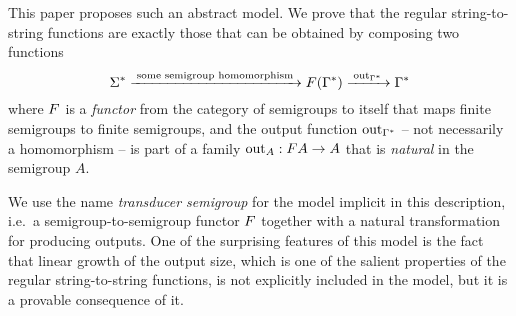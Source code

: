 This paper proposes such an abstract model.  We prove that the regular  string-to-string functions are exactly those that can be obtained by composing two functions
\[ \Sigma^* 
  \xrightarrow{\;\text{some semigroup homomorphism}\;}
    \functor(\Gamma^*)
    \xrightarrow{\;\outfun_{\Gamma^*}\;}
    \Gamma^*
\]
where $\functor$ is a \emph{functor} from the category of semigroups to itself that
maps finite semigroups to finite semigroups, and the output function
$\mathrm{out}_{\Gamma^*}$ -- not necessarily a homomorphism -- is part of a family
$\outfun_A : \functor A \to A$ that is \emph{natural} in the semigroup $A$.%

We use the name \emph{transducer semigroup} for the model implicit in this description, i.e.~a semigroup-to-semigroup functor $\functor$ together with a natural transformation for producing outputs.  One of the surprising features of this model is the fact that linear growth of the output size, which is one of the salient properties of the regular string-to-string functions, is not explicitly included in the model, but it is a provable consequence of it. 



